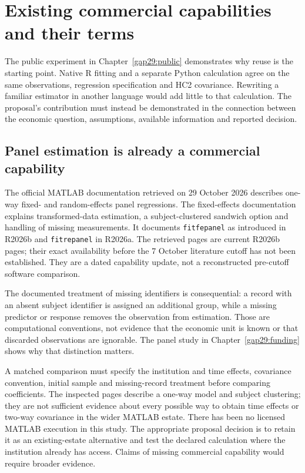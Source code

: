 \section{Existing commercial capabilities and their terms}
\label{gap29:software-followup}
The public experiment in Chapter~\ref{gap29:public} demonstrates why reuse is the starting point. Native
R fitting and a separate Python calculation agree on the same observations,
regression specification and HC2 covariance. Rewriting a familiar estimator
in another language would add little to that calculation. The proposal's
contribution must instead be demonstrated in the connection between the
economic question, assumptions, available information and reported decision.

\subsection{Panel estimation is already a commercial capability}
The official MATLAB documentation retrieved on 29 October 2026 describes
one-way fixed- and random-effects panel regressions. The fixed-effects
documentation explains transformed-data estimation, a subject-clustered
sandwich option and handling of missing measurements. It documents
\texttt{fitfepanel} as introduced in R2026b and
\texttt{fitrepanel} in R2026a. The retrieved pages are current R2026b pages;
their exact availability before the 7 October literature cutoff has not been
established. They are a dated capability update, not a reconstructed
pre-cutoff software comparison. \citep{gap29matlab}

The documented treatment of missing identifiers is consequential: a record
with an absent subject identifier is assigned an additional group, while a
missing predictor or response removes the observation from estimation.
Those are computational conventions, not evidence that the economic unit
is known or that discarded observations are ignorable. The panel study in
Chapter~\ref{gap29:funding} shows why that distinction matters.

A matched comparison must specify the institution and time effects,
covariance convention, initial sample and missing-record treatment before
comparing coefficients. The inspected pages describe a one-way model and
subject clustering; they are not sufficient evidence about every possible
way to obtain time effects or two-way covariance in the wider MATLAB estate.
There has been no licensed MATLAB execution in this study. The appropriate
proposal decision is to retain it as an existing-estate alternative and
test the declared calculation where the institution already has access.
Claims of missing commercial capability would require broader evidence.

